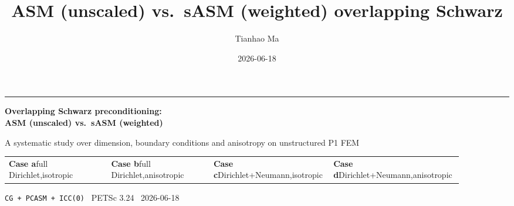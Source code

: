 \documentclass[aspectratio=169,10pt]{beamer}
\title{ASM (unscaled) vs.\ sASM (weighted) overlapping Schwarz}
\author{Tianhao Ma}
\date{2026-06-18}
\begin{document}
{
\begin{frame}[plain]
  \vspace{0.6em}
  {\color{teal}\rule{\linewidth}{2pt}}\par\vspace{1.2em}
  {\color{white}\LARGE\bfseries Overlapping Schwarz preconditioning:\\[0.25em]
   ASM (unscaled) vs.\ sASM (weighted)\par}
  \vspace{0.6em}
  {\color{white!80!teal}\large A systematic study over dimension, boundary conditions and anisotropy on unstructured P1 FEM\par}
  \vspace{1.4em}
  {\footnotesize\color{white}%
   \begin{tabular}{@{}p{0.225\linewidth}p{0.225\linewidth}p{0.225\linewidth}p{0.225\linewidth}@{}}
   \textcolor{amber}{\textbf{Case a}}\newline full Dirichlet,\newline isotropic &
   \textcolor{amber}{\textbf{Case b}}\newline full Dirichlet,\newline anisotropic &
   \textcolor{amber}{\textbf{Case c}}\newline Dirichlet+Neumann,\newline isotropic &
   \textcolor{amber}{\textbf{Case d}}\newline Dirichlet+Neumann,\newline anisotropic \\
   \end{tabular}\par}
  \vspace{1.2em}
  {\small\color{white!70!navy}\texttt{CG + PCASM + ICC(0)} \textperiodcentered\ PETSc 3.24 \textperiodcentered\ 2026-06-18\par}
  \vspace{0.4em}{\color{amber}\rule{\linewidth}{2pt}}
\end{frame}}
\end{document}
